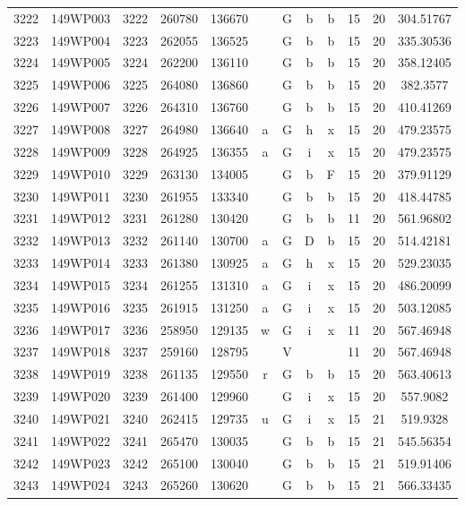 \begin{tabular}{|*{12}{c|}}
3222 & 149WP003 & 3222 & 260780 & 136670 &  & G & b & b & 15 & 20 & 304.51767 \\ 
3223 & 149WP004 & 3223 & 262055 & 136525 &  & G & b & b & 15 & 20 & 335.30536 \\ 
3224 & 149WP005 & 3224 & 262200 & 136110 &  & G & b & b & 15 & 20 & 358.12405 \\ 
3225 & 149WP006 & 3225 & 264080 & 136860 &  & G & b & b & 15 & 20 & 382.3577 \\ 
3226 & 149WP007 & 3226 & 264310 & 136760 &  & G & b & b & 15 & 20 & 410.41269 \\ 
3227 & 149WP008 & 3227 & 264980 & 136640 & a & G & h & x & 15 & 20 & 479.23575 \\ 
3228 & 149WP009 & 3228 & 264925 & 136355 & a & G & i & x & 15 & 20 & 479.23575 \\ 
3229 & 149WP010 & 3229 & 263130 & 134005 &  & G & b & F & 15 & 20 & 379.91129 \\ 
3230 & 149WP011 & 3230 & 261955 & 133340 &  & G & b & b & 15 & 20 & 418.44785 \\ 
3231 & 149WP012 & 3231 & 261280 & 130420 &  & G & b & b & 11 & 20 & 561.96802 \\ 
3232 & 149WP013 & 3232 & 261140 & 130700 & a & G & D & b & 15 & 20 & 514.42181 \\ 
3233 & 149WP014 & 3233 & 261380 & 130925 & a & G & h & x & 15 & 20 & 529.23035 \\ 
3234 & 149WP015 & 3234 & 261255 & 131310 & a & G & i & x & 15 & 20 & 486.20099 \\ 
3235 & 149WP016 & 3235 & 261915 & 131250 & a & G & i & x & 15 & 20 & 503.12085 \\ 
3236 & 149WP017 & 3236 & 258950 & 129135 & w & G & i & x & 11 & 20 & 567.46948 \\ 
3237 & 149WP018 & 3237 & 259160 & 128795 &  & V &  &  & 11 & 20 & 567.46948 \\ 
3238 & 149WP019 & 3238 & 261135 & 129550 & r & G & b & b & 15 & 20 & 563.40613 \\ 
3239 & 149WP020 & 3239 & 261400 & 129960 &  & G & i & x & 15 & 20 & 557.9082 \\ 
3240 & 149WP021 & 3240 & 262415 & 129735 & u & G & i & x & 15 & 21 & 519.9328 \\ 
3241 & 149WP022 & 3241 & 265470 & 130035 &  & G & b & b & 15 & 21 & 545.56354 \\ 
3242 & 149WP023 & 3242 & 265100 & 130040 &  & G & b & b & 15 & 21 & 519.91406 \\ 
3243 & 149WP024 & 3243 & 265260 & 130620 &  & G & b & b & 15 & 21 & 566.33435 \\ 

\end{tabular}
